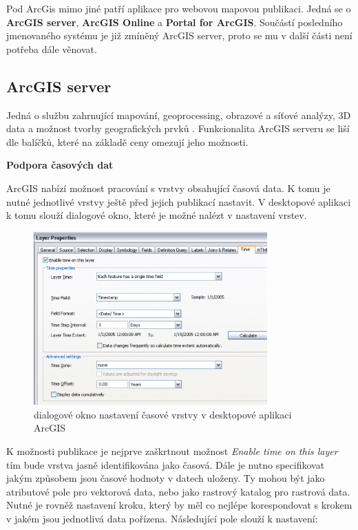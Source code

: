 Pod ArcGis mimo jiné patří aplikace pro webovou mapovou
publikaci. Jedná se o \textbf{ArcGIS server}, \textbf{ArcGIS Online} a
\textbf{Portal for ArcGIS}. Součástí posledního jmenovaného systému je
již zmíněný ArcGIS server, proto se mu v další části není potřeba dále
věnovat.

\newpage
\subsection{ArcGIS server}

Jedná o službu zahrnující mapování, geoprocessing, obrazové a síťové
analýzy, 3D data a možnost tvorby geografických prvků
\cite{arcgis-publishing-service}. Funkcionalita ArcGIS serveru se liší
dle balíčků, které na základě ceny omezují jeho možnosti.

\bigskip
\noindent \textbf{Podpora časových dat}
 
ArcGIS nabízí možnost pracování s vrstvy obsahující časová data. K
tomu je nutné jednotlivé vrstvy ještě před jejich publikací
nastavit. V desktopové aplikaci k tomu slouží dialogové okno, které je
možné nalézt v nastavení vrstev.

\begin{figure}[h!]  \centering
\includegraphics[width=0.8\textwidth]{../img/arcgis-layer-edit.png}
	\caption{dialogové okno nastavení časové vrstvy v desktopové
aplikaci ArcGIS}
	\label{fig:arcgis-time-settings}
\end{figure}

K možnosti publikace je nejprve zaškrtnout možnost \textit{Enable time
on this layer} tím bude vrstva jasně identifikována jako časová. Dále
je nutno specifikovat jakým způsobem jsou časové hodnoty v datech
uloženy. Ty mohou být jako atributové pole pro vektorová data, nebo
jako rastrový katalog pro rastrová data. Nutné je rovněž nastavení
kroku, který by měl co nejlépe korespondovat s krokem v jakém jsou
jednotlivá data pořízena. Následující pole slouží k nastavení:

